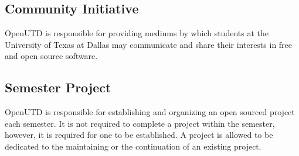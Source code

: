 \documentclass{constitution}
\begin{document}
\subsection{Community Initiative}
OpenUTD is responsible for providing mediums by which students at the University of Texas at Dallas may communicate and share their interests in free and open source software.

\subsection{Semester Project}
OpenUTD is responsible for establishing and organizing an open sourced project each semester.
It is not required to complete a project within the semester, however, it is required for one to be established.
A project is allowed to be dedicated to the maintaining or the continuation of an existing project.
\end{document}
